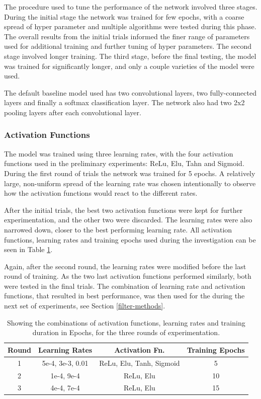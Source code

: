 \documentclass[]{article}
\begin{document}
The procedure used to tune the performance of the network involved three stages. During the initial stage the network was trained for few epochs, with a coarse spread of hyper parameter and multiple algorithms were tested during this phase. The overall results from the initial trials informed the finer range of parameters used for additional training and further tuning of hyper parameters. The second stage involved longer training. The third stage, before the final testing, the model was trained for significantly longer, and only a couple varieties of the model were used. 

The default baseline model used has two convolutional layers, two fully-connected layers and finally a softmax classification layer. The network also had two 2x2 pooling layers after each convolutional layer. 

\subsubsection{Activation Functions}

The model was trained using three learning rates, with the four activation functions used in the preliminary experiments: ReLu, Elu, Tahn and Sigmoid. During the first round of trials the network was trained for 5 epochs. A relatively large, non-uniform spread of the learning rate was chosen intentionally to observe how the activation functions would react to the different rates. 

After the initial trials, the best two activation functions were kept for further experimentation, and the other two were discarded. The learning rates were also narrowed down, closer to the best performing learning rate. All activation functions, learning rates and training epochs used during the investigation can be seen in Table \ref{ac-overview}.

Again, after the second round, the learning rates were modified before the last round of training. As the two last activation functions performed similarly, both were tested in the final trials. The combination of learning rate and activation functions, that resulted in best performance, was then used for the during the next set of experiments, see Section \ref{filter-methods}.

\begin{table}[h]
	\centering
	\caption{Showing the combinations of activation functions, learning rates and training duration in Epochs, for the three rounds of experimentation.}
	\label{ac-overview}
	\begin{tabular}{@{}cccc@{}}
		\toprule
		Round & Learning Rates & Activation Fn. & Training Epochs \\ \midrule
		1 & 5e-4, 3e-3, 0.01 & ReLu, Elu, Tanh, Sigmoid & 5 \\
		2 & 1e-4, 9e-4 & ReLu, Elu & 10 \\
		3 & 4e-4, 7e-4 & ReLu, Elu & 15 \\ \bottomrule
	\end{tabular}
\end{table}
\end{document}
